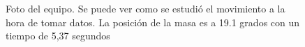 \documentclass[aps,twocolumn,secnumarabic,nobalancelastpage,amsmath,amssymb,nofootinbib]{revtex4-1}
\begin{document}
		\begin{figure}[!htb]
			\caption{Foto del equipo. Se puede ver como se estudi\'o el movimiento a la hora de tomar datos. La posici\'on de la masa es a 19.1 grados con un tiempo de 5,37 segundos}
			\label{fig:equipo}
		\end{figure} 
		
			
	
		
		
	
	
\end{document}
